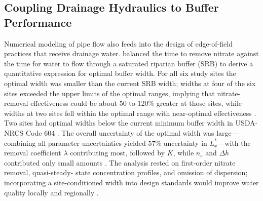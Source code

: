 \documentclass[11pt]{article}
\begin{document}
\subsection{Coupling Drainage Hydraulics to Buffer Performance}

Numerical modeling of pipe flow also feeds into the design of edge-of-field practices that
receive drainage water. \textcite{McEachran2020} balanced the time to remove nitrate
against the time for water to flow through a saturated riparian buffer (SRB) to derive a
quantitative expression for optimal buffer width. For all six study sites the optimal width
was smaller than the current SRB width; widths at four of the six sites exceeded the upper
limits of the optimal ranges, implying that nitrate-removal effectiveness could be about 50
to 120\% greater at those sites, while widths at two sites fell within the optimal range
with near-optimal effectiveness \parencite{McEachran2020}. Two sites had optimal widths
below the current minimum buffer width in USDA-NRCS Code 604 \parencite{McEachran2020}. The
overall uncertainty of the optimal width was large---combining all parameter uncertainties
yielded 57\% uncertainty in $L_x^*$---with the removal coefficient $\lambda$ contributing
most, followed by $K$, while $n_e$ and $\Delta h$ contributed only small amounts
\parencite{McEachran2020}. The analysis rested on first-order nitrate removal, quasi-steady-
state concentration profiles, and omission of dispersion; incorporating a site-conditioned
width into design standards would improve water quality locally and regionally
\parencite{McEachran2020}.

\printbibliography
\end{document}
